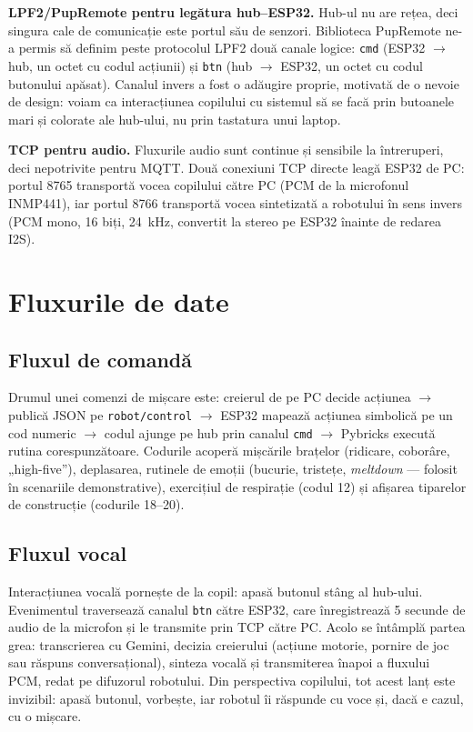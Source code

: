 \textbf{LPF2/PupRemote pentru legătura hub--ESP32.} Hub-ul nu are rețea, deci singura cale de comunicație este portul său de senzori. Biblioteca PupRemote ne-a permis să definim peste protocolul LPF2 două canale logice: \texttt{cmd} (ESP32 $\rightarrow$ hub, un octet cu codul acțiunii) și \texttt{btn} (hub $\rightarrow$ ESP32, un octet cu codul butonului apăsat). Canalul invers a fost o adăugire proprie, motivată de o nevoie de design: voiam ca interacțiunea copilului cu sistemul să se facă prin butoanele mari și colorate ale hub-ului, nu prin tastatura unui laptop.

\textbf{TCP pentru audio.} Fluxurile audio sunt continue și sensibile la întreruperi, deci nepotrivite pentru MQTT. Două conexiuni TCP directe leagă ESP32 de PC: portul 8765 transportă vocea copilului către PC (PCM de la microfonul INMP441), iar portul 8766 transportă vocea sintetizată a robotului în sens invers (PCM mono, 16 biți, 24~kHz, convertit la stereo pe ESP32 înainte de redarea I2S).

\section{Fluxurile de date}

\subsection{Fluxul de comandă}

Drumul unei comenzi de mișcare este: creierul de pe PC decide acțiunea $\rightarrow$ publică JSON pe \texttt{robot/control} $\rightarrow$ ESP32 mapează acțiunea simbolică pe un cod numeric $\rightarrow$ codul ajunge pe hub prin canalul \texttt{cmd} $\rightarrow$ Pybricks execută rutina corespunzătoare. Codurile acoperă mișcările brațelor (ridicare, coborâre, „high-five”), deplasarea, rutinele de emoții (bucurie, tristețe, \emph{meltdown} — folosit în scenariile demonstrative), exercițiul de respirație (codul 12) și afișarea tiparelor de construcție (codurile 18--20).

\subsection{Fluxul vocal}

Interacțiunea vocală pornește de la copil: apasă butonul stâng al hub-ului. Evenimentul traversează canalul \texttt{btn} către ESP32, care înregistrează 5 secunde de audio de la microfon și le transmite prin TCP către PC. Acolo se întâmplă partea grea: transcrierea cu Gemini, decizia creierului (acțiune motorie, pornire de joc sau răspuns conversațional), sinteza vocală și transmiterea înapoi a fluxului PCM, redat pe difuzorul robotului. Din perspectiva copilului, tot acest lanț este invizibil: apasă butonul, vorbește, iar robotul îi răspunde cu voce și, dacă e cazul, cu o mișcare.


